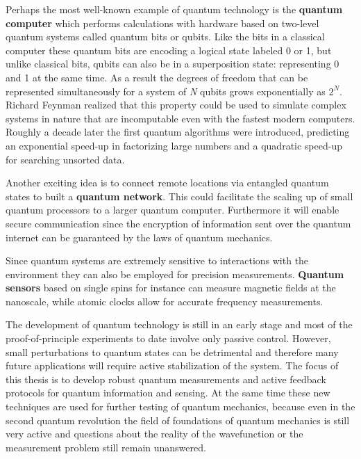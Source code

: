 Perhaps the most well-known example of quantum technology is the \textbf{quantum computer}\cite{Nielsen__2000,Mermin__2007} which performs calculations with hardware based on two-level quantum systems called quantum bits or qubits. Like the bits in a classical computer these quantum bits are encoding a logical state labeled 0 or 1, but unlike classical bits, qubits can also be in a superposition state: representing 0 and 1 at the same time. As a result the degrees of freedom that can be represented simultaneously for a system of \textit{N} qubits grows exponentially as $2^N$. Richard Feynman realized that this property could be used to simulate complex systems in nature\cite{Feynman_IntJTheorPhys_1982} that are incomputable even with the fastest modern computers. Roughly a decade later the first quantum algorithms were introduced, predicting an exponential speed-up in factorizing large numbers\cite{Shor_SIAMJ.Comput._1997} and a quadratic speed-up for searching unsorted data\cite{Grover_Phys.Rev.Lett._1997}.

Another exciting idea is to connect remote locations via entangled quantum states to built a \textbf{quantum network}\cite{Kimble_Nature_2008}. This could facilitate the scaling up of small quantum processors to a larger quantum computer. Furthermore it will enable secure communication since the encryption of information sent over the quantum internet can be guaranteed by the laws of quantum mechanics\cite{Gisin_NatPhoton_2007}.

Since quantum systems are extremely sensitive to interactions with the environment they can also be employed for precision measurements. \textbf{Quantum sensors} based on single spins for instance can measure magnetic fields at the nanoscale\cite{Taylor_NatPhys_2008}, while atomic clocks allow for accurate frequency measurements\cite{Diddams_Science_2001}.

The development of quantum technology is still in an early stage and most of the proof-of-principle experiments to date involve only passive control. However, small perturbations to quantum states can be detrimental and therefore many future applications will require active stabilization of the system. The focus of this thesis is to develop robust quantum measurements and active feedback protocols for quantum information and sensing\cite{Wiseman__2010}. At the same time these new techniques are used for further testing of quantum mechanics, because even in the second quantum revolution the field of foundations of quantum mechanics is still very active and questions about the reality of the wavefunction\cite{Pusey_NatPhys_2012} or the measurement problem still remain unanswered\cite{}. 

